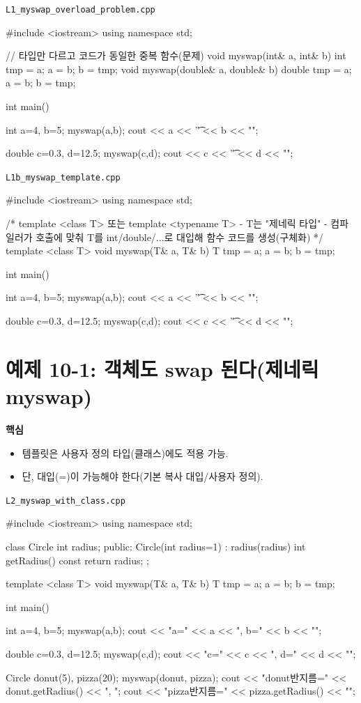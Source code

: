\documentclass[11pt,a4paper]{article}
\newcommand{\filetag}[1]{\texttt{\color{Accent}#1}}
\begin{document}
\noindent\filetag{L1\_myswap\_overload\_problem.cpp}
\begin{cppcode}
#include <iostream>
using namespace std;

// 타입만 다르고 코드가 동일한 중복 함수(문제)
void myswap(int& a, int& b) {
    int tmp = a; a = b; b = tmp;
}
void myswap(double& a, double& b) {
    double tmp = a; a = b; b = tmp;
}

int main() {
    int a=4, b=5;
    myswap(a,b);
    cout << a << '\t' << b << "\n";

    double c=0.3, d=12.5;
    myswap(c,d);
    cout << c << '\t' << d << "\n";
}
\end{cppcode}

\noindent\filetag{L1b\_myswap\_template.cpp}
\begin{cppcode}
#include <iostream>
using namespace std;

/*
template <class T> 또는 template <typename T>
- T는 "제네릭 타입"
- 컴파일러가 호출에 맞춰 T를 int/double/...로 대입해 함수 코드를 생성(구체화)
*/
template <class T>
void myswap(T& a, T& b) {
    T tmp = a;
    a = b;
    b = tmp;
}

int main() {
    int a=4, b=5;
    myswap(a,b);
    cout << a << '\t' << b << "\n";

    double c=0.3, d=12.5;
    myswap(c,d);
    cout << c << '\t' << d << "\n";
}
\end{cppcode}

\section{예제 10-1: 객체도 swap 된다(제네릭 myswap)}
\begin{GoalBox}
\textbf{핵심}
\begin{itemize}[leftmargin=18pt]
  \item 템플릿은 사용자 정의 타입(클래스)에도 적용 가능.
  \item 단, 대입(=)이 가능해야 한다(기본 복사 대입/사용자 정의).
\end{itemize}
\end{GoalBox}

\noindent\filetag{L2\_myswap\_with\_class.cpp}
\begin{cppcode}
#include <iostream>
using namespace std;

class Circle {
    int radius;
public:
    Circle(int radius=1) : radius(radius) {}
    int getRadius() const { return radius; }
};

template <class T>
void myswap(T& a, T& b) {
    T tmp = a;
    a = b;
    b = tmp;
}

int main() {
    int a=4, b=5;
    myswap(a,b);
    cout << "a=" << a << ", b=" << b << "\n";

    double c=0.3, d=12.5;
    myswap(c,d);
    cout << "c=" << c << ", d=" << d << "\n";

    Circle donut(5), pizza(20);
    myswap(donut, pizza);
    cout << "donut반지름=" << donut.getRadius() << ", ";
    cout << "pizza반지름=" << pizza.getRadius() << "\n";
}
\end{cppcode}
\end{document}
